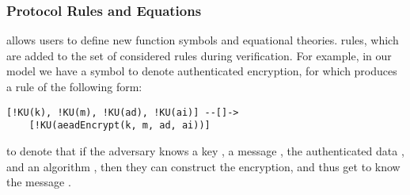 
\subsubsection{Protocol Rules and Equations}
\mTamarin{} allows users to define new function symbols and equational theories.
rules, which are added to the set of considered rules during verification.
For example, in our model we have a symbol to denote authenticated encryption,
for which \mTamarin{} produces a rule of the following form:
%
\begin{small}
\begin{verbatim}
[!KU(k), !KU(m), !KU(ad), !KU(ai)] --[]->
    [!KU(aeadEncrypt(k, m, ad, ai))]
\end{verbatim}
\end{small}
%
to denote that if the adversary knows a key , a message , the
authenticated data , and an algorithm , then they can construct
the encryption, and thus get to know the message
.
%

